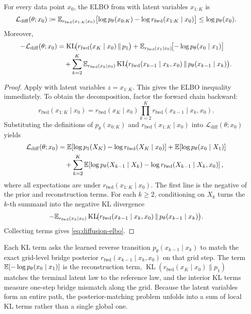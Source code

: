 \begin{proposition}
\label{prop:diffusion-elbo}
For every data point \(x_0\), the ELBO from  with latent variables \(x_{1:K}\) is
\[
  \mathcal{L}_{\mathrm{diff}}(\theta;x_0)
  \coloneqq
  \mathbb{E}_{r_{\mathrm{fwd}}(x_{1:K}\mid x_0)}
  \bigl[\log p_\theta(x_{0:K})-\log r_{\mathrm{fwd}}(x_{1:K}\mid x_0)\bigr]
  \le \log p_\theta(x_0).
\]
Moreover,
\begin{align}
  -\mathcal{L}_{\mathrm{diff}}(\theta;x_0)
  &=
  \operatorname{KL}\!\bigl(r_{\mathrm{fwd}}(x_K\mid x_0)\,\|\,p_1\bigr)
  +
  \mathbb{E}_{r_{\mathrm{fwd}}(x_1\mid x_0)}\!\bigl[-\log p_\theta(x_0\mid x_1)\bigr]
  \nonumber\\
  &\quad+
  \sum_{k=2}^K
  \mathbb{E}_{r_{\mathrm{fwd}}(x_k\mid x_0)}
  \operatorname{KL}\!\bigl(
    r_{\mathrm{fwd}}(x_{k-1}\mid x_k,x_0)
    \,\|\,p_\theta(x_{k-1}\mid x_k)
  \bigr).
  \label{eq:diffusion-elbo}
\end{align}
\end{proposition}
\begin{proof}
Apply  with latent variables \(z=x_{1:K}\).
This gives the ELBO inequality immediately.
To obtain the decomposition, factor the forward chain backward:
\[
  r_{\mathrm{fwd}}(x_{1:K}\mid x_0)
  =
  r_{\mathrm{fwd}}(x_K\mid x_0)\prod_{k=2}^K r_{\mathrm{fwd}}(x_{k-1}\mid x_k,x_0).
\]
Substituting the definitions of \(p_\theta(x_{0:K})\) and \(r_{\mathrm{fwd}}(x_{1:K}\mid x_0)\) into \(\mathcal{L}_{\mathrm{diff}}(\theta;x_0)\) yields
\begin{align*}
  \mathcal{L}_{\mathrm{diff}}(\theta;x_0)
  &=
  \mathbb{E}\!\left[\log p_1(X_K)-\log r_{\mathrm{fwd}}(X_K\mid x_0)\right]
  +
  \mathbb{E}\!\left[\log p_\theta(x_0\mid X_1)\right] \\
  &\quad+
  \sum_{k=2}^K
  \mathbb{E}\!\left[
    \log p_\theta(X_{k-1}\mid X_k)
    -
    \log r_{\mathrm{fwd}}(X_{k-1}\mid X_k,x_0)
  \right],
\end{align*}
where all expectations are under \(r_{\mathrm{fwd}}(x_{1:K}\mid x_0)\).
The first line is the negative of the prior and reconstruction terms.
For each \(k\ge 2\), conditioning on \(X_k\) turns the \(k\)-th summand into the negative KL divergence
\[
  -\mathbb{E}_{r_{\mathrm{fwd}}(x_k\mid x_0)}
  \operatorname{KL}\!\bigl(
    r_{\mathrm{fwd}}(x_{k-1}\mid x_k,x_0)
    \,\|\,p_\theta(x_{k-1}\mid x_k)
  \bigr).
\]
Collecting terms gives \eqref{eq:diffusion-elbo}.%
\end{proof}

Each KL term asks the learned reverse transition \(p_\theta(x_{k-1}\mid x_k)\) to match the exact grid-level bridge posterior \(r_{\mathrm{fwd}}(x_{k-1}\mid x_k,x_0)\) on that grid step.
The term \(\mathbb{E}[-\log p_\theta(x_0\mid x_1)]\) is the reconstruction term, \(\operatorname{KL}(r_{\mathrm{fwd}}(x_K\mid x_0)\|p_1)\) matches the terminal latent law to the reference law, and the interior KL terms measure one-step bridge mismatch along the grid.
Because the latent variables form an entire path, the posterior-matching problem unfolds into a sum of local KL terms rather than a single global one.

